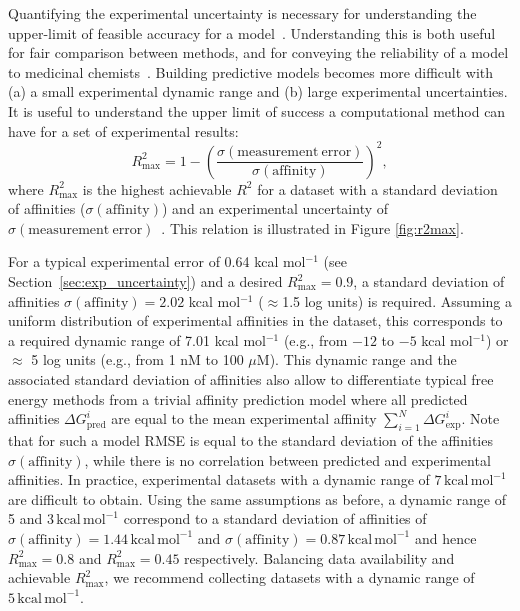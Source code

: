 \documentclass[9pt,bestpractices]{livecoms}
\begin{document}
Quantifying the experimental uncertainty is necessary for understanding the upper-limit of feasible accuracy for a model~\cite{brown2009healthy}. Understanding this is both useful for fair comparison between methods, and for conveying the reliability of a model to medicinal chemists~\cite{griffen2020chemists}. Building predictive models becomes more difficult with (a) a small experimental dynamic range and (b) large experimental uncertainties. It is useful to understand the upper limit of success a computational method can have for a set of experimental results:
%
\begin{equation}\label{eqn:r2max}
    R^2_{\mathrm{max}} = 1 - \left(\frac{\sigma(\mathrm{measurement\   error})}{\sigma({\mathrm{affinity}})}\right) ^2,
\end{equation}
%
where $R^2_{\mathrm{max}}$ is the highest achievable $R^2$ for a dataset with a standard deviation of affinities ($\sigma(\mathrm{affinity})$) and an experimental uncertainty of  $\sigma\mathrm{(measurement\ error)}$~\cite{sheridan2020experimental}. This relation is illustrated in Figure \ref{fig:r2max}.

For a typical experimental error of 0.64 kcal mol$^{-1}$ (see Section~\ref{sec:exp_uncertainty}) and a desired $R^2_{\mathrm{max}} = 0.9$, a standard deviation of affinities $\sigma(\mathrm{affinity}) = 2.02 $ kcal mol$^{-1}$ ($\approx$1.5 log units) is required. Assuming a uniform distribution of experimental affinities in the dataset, this corresponds to a required dynamic range of 7.01 kcal mol$^{-1}$ (e.g., from $-12$ to $-5$ kcal mol$^{-1}$) or $\approx$ 5 log units (e.g., from 1 nM to 100 $\mu$M). This dynamic range and the associated standard deviation of affinities also allow to differentiate typical free energy methods from a trivial affinity prediction model where all predicted affinities $\Delta G_{\text{pred}}^i$ are equal to the mean experimental affinity $\sum_{i=1}^{N} \Delta G_{\text{exp}}^i$. Note that for such a model RMSE is equal to the standard deviation of the affinities $\sigma({\mathrm{affinity}})$, while there is no correlation between predicted and experimental affinities. In practice, experimental datasets with a dynamic range of $7\,\mathrm{kcal\,mol^{-1}}$ are difficult to obtain. Using the same assumptions as before, a dynamic range of 5 and $3\,\mathrm{kcal\,mol^{-1}}$ correspond to a standard deviation of affinities of $\sigma(\mathrm{affinity}) = 1.44\,\mathrm{kcal\,mol^{-1}}$ and $\sigma(\mathrm{affinity}) = 0.87\,\mathrm{kcal\,mol^{-1}}$ and hence $R^2_{\mathrm{max}} = 0.8$ and $R^2_{\mathrm{max}} = 0.45$ respectively. Balancing data availability and achievable $R^2_{\mathrm{max}}$, we recommend collecting datasets with a dynamic range of $5\,\mathrm{kcal\,mol^{-1}}$.
\end{document}
